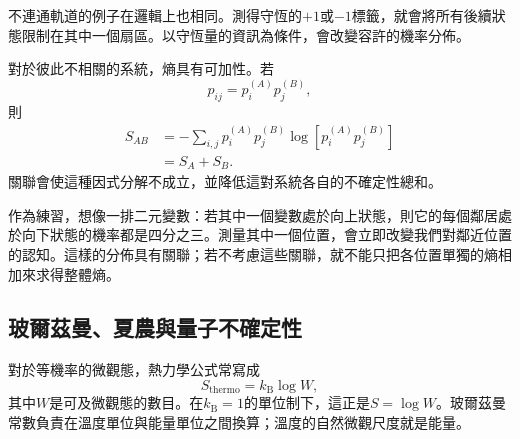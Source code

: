 \begin{classroomqa}
\end{classroomqa}

不連通軌道的例子在邏輯上也相同。測得守恆的\(+1\)或\(-1\)標籤，就會將所有後續狀態限制在其中一個扇區。以守恆量的資訊為條件，會改變容許的機率分佈。

對於彼此不相關的系統，熵具有可加性。若
\begin{equation}
 p_{ij}=p_i^{(A)}p_j^{(B)},
\end{equation}
則
\begin{align}
 S_{AB}
 &=-\sum_{i,j}p_i^{(A)}p_j^{(B)}
 \log\!\left[p_i^{(A)}p_j^{(B)}\right]\\
 &=S_A+S_B.
 \label{eq:sm1-entropy-additivity}
\end{align}
關聯會使這種因式分解不成立，並降低這對系統各自的不確定性總和。

作為練習，想像一排二元變數：若其中一個變數處於向上狀態，則它的每個鄰居處於向下狀態的機率都是四分之三。測量其中一個位置，會立即改變我們對鄰近位置的認知。這樣的分佈具有關聯；若不考慮這些關聯，就不能只把各位置單獨的熵相加來求得整體熵。

\subsection{玻爾茲曼、夏農與量子不確定性}

\begin{classroomqa}
\end{classroomqa}

對於等機率的微觀態，熱力學公式常寫成
\begin{equation}
 S_{\mathrm{thermo}}=k_{\mathrm B}\log W,
 \label{eq:sm1-boltzmann-formula}
\end{equation}
其中\(W\)是可及微觀態的數目。在\(k_{\mathrm B}=1\)的單位制下，這正是\(S=\log W\)。玻爾茲曼常數負責在溫度單位與能量單位之間換算；溫度的自然微觀尺度就是能量。

